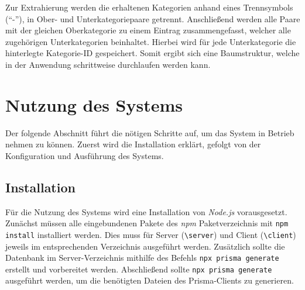 Zur Extrahierung werden die erhaltenen Kategorien anhand eines Trennsymbols (\enquote{-}), in Ober- und
Unterkategoriepaare getrennt. Anschließend werden alle Paare mit der gleichen Oberkategorie zu einem
Eintrag zusammengefasst, welcher alle zugehörigen Unterkategorien beinhaltet. Hierbei wird für jede
Unterkategorie die hinterlegte Kategorie-ID gespeichert. Somit ergibt sich eine Baumstruktur, welche
in der Anwendung schrittweise durchlaufen werden kann.


\section{Nutzung des Systems}
\label{subsec:nutzung}
Der folgende Abschnitt führt die nötigen Schritte auf, um das System in Betrieb nehmen zu können.
Zuerst wird die Installation erklärt, gefolgt von der Konfiguration und Ausführung des Systems.

\subsection{Installation}
Für die Nutzung des Systems wird eine Installation von \textit{Node.js} vorausgesetzt. Zunächst
müssen alle eingebundenen Pakete des \textit{npm} Paketverzeichnis mit \lstinline{npm install}
installiert werden. Dies muss für Server (\lstinline{\server}) und Client (\lstinline{\client})
jeweils im entsprechenden Verzeichnis ausgeführt werden. Zusätzlich sollte die Datenbank im
Server-Verzeichnis mithilfe des Befehls \lstinline{npx prisma generate}
erstellt und vorbereitet werden. Abschließend sollte \lstinline{npx prisma generate} ausgeführt
werden, um die benötigten Dateien des Prisma-Clients zu generieren.

